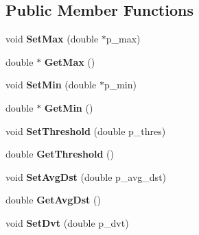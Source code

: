 \subsection*{Public Member Functions}
\begin{DoxyCompactItemize}
\item 
\hypertarget{classEuclideanModel_ab8ab5c07885267649b3b209580df4987}{}void {\bfseries Set\+Max} (double $\ast$p\+\_\+max)\label{classEuclideanModel_ab8ab5c07885267649b3b209580df4987}

\item 
\hypertarget{classEuclideanModel_aea454d5970238c76484d64a582262bfe}{}double $\ast$ {\bfseries Get\+Max} ()\label{classEuclideanModel_aea454d5970238c76484d64a582262bfe}

\item 
\hypertarget{classEuclideanModel_a0dc92790300467bf9c0de80deea99f1b}{}void {\bfseries Set\+Min} (double $\ast$p\+\_\+min)\label{classEuclideanModel_a0dc92790300467bf9c0de80deea99f1b}

\item 
\hypertarget{classEuclideanModel_a4c37d253d3c22746b29dc9aec1c3a982}{}double $\ast$ {\bfseries Get\+Min} ()\label{classEuclideanModel_a4c37d253d3c22746b29dc9aec1c3a982}

\item 
\hypertarget{classEuclideanModel_a47ac11e9db0c00f0f33b129ce130a23e}{}void {\bfseries Set\+Threshold} (double p\+\_\+thres)\label{classEuclideanModel_a47ac11e9db0c00f0f33b129ce130a23e}

\item 
\hypertarget{classEuclideanModel_a5198642a71088c7a8213aba2d3da7e4b}{}double {\bfseries Get\+Threshold} ()\label{classEuclideanModel_a5198642a71088c7a8213aba2d3da7e4b}

\item 
\hypertarget{classEuclideanModel_a64bee90910044ea9072b5b94729e690b}{}void {\bfseries Set\+Avg\+Dst} (double p\+\_\+avg\+\_\+dst)\label{classEuclideanModel_a64bee90910044ea9072b5b94729e690b}

\item 
\hypertarget{classEuclideanModel_a87567dde151b28378135ac0bb2fbdbe0}{}double {\bfseries Get\+Avg\+Dst} ()\label{classEuclideanModel_a87567dde151b28378135ac0bb2fbdbe0}

\item 
\hypertarget{classEuclideanModel_a9e6d476b458300bbb30fc95b1b3be833}{}void {\bfseries Set\+Dvt} (double p\+\_\+dvt)\label{classEuclideanModel_a9e6d476b458300bbb30fc95b1b3be833}


\end{DoxyCompactItemize}
